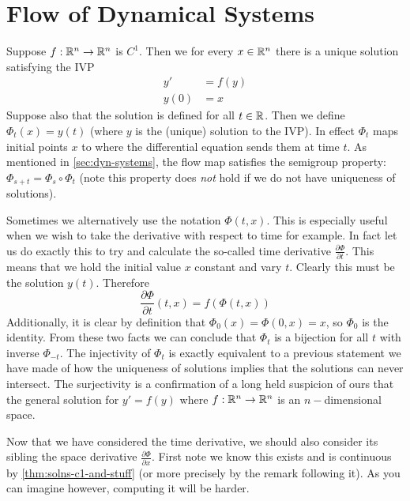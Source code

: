 \section{Flow of Dynamical Systems}
Suppose $f: \mathbb{R}^n \to \mathbb{R}^n$ is $C^1$. Then we for every $x \in \mathbb{R}^n$ there is a unique solution satisfying the IVP
\begin{align*}
    y' &= f(y)\\
    y(0) &= x
\end{align*}
Suppose also that the solution is defined for all $t \in \mathbb{R}$.
Then we define $\Phi_t(x) = y(t)$ (where $y$ is the (unique) solution to the IVP). In effect $\Phi_t$ maps initial points $x$ to where the differential equation sends them at time $t$. As mentioned in \autoref{sec:dyn-systems}, the flow map satisfies the semigroup property: $\Phi_{s + t} = \Phi_s \circ \Phi_t$ (note this property does \textit{not} hold if we do not have uniqueness of solutions).

Sometimes we alternatively use the notation $\Phi(t, x)$. This is especially useful when we wish to take the derivative with respect to time for example. In fact let us do exactly this to try and calculate the so-called time derivative $\frac{\partial \Phi}{\partial t}$. This means that we hold the initial value $x$ constant and vary $t$. Clearly this must be the solution $y(t)$. Therefore
$$ \frac{\partial \Phi}{\partial t} (t, x) =  f(\Phi(t, x)) $$
Additionally, it is clear by definition that $\Phi_0(x) = \Phi(0, x) = x$, so $\Phi_0$ is the identity. From these two facts we can conclude that $\Phi_t$ is a bijection for all $t$ with inverse $\Phi_{-t}$. The injectivity of $\Phi_t$ is exactly equivalent to a previous statement we have made of how the uniqueness of solutions implies that the solutions can never intersect. The surjectivity is a confirmation of a long held suspicion of ours that the general solution for $y' = f(y)$ where $f: \mathbb{R}^n \to \mathbb{R}^n$ is an $n-$dimensional space.

Now that we have considered the time derivative, we should also consider its sibling the space derivative $\frac{\partial \Phi}{\partial x}$. First note we know this exists and is continuous by \autoref{thm:solns-c1-and-stuff} (or more precisely by the remark following it). As you can imagine however, computing it will be harder.\\

